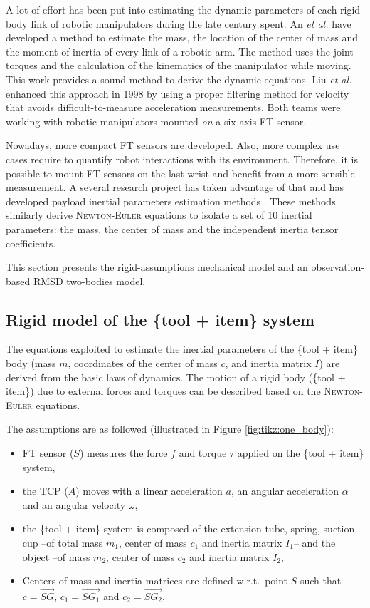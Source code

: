 \documentclass[/home/francois/latex/report/main.tex]{subfiles}
\begin{document}
A lot of effort has been put into estimating the dynamic parameters of each rigid body link of robotic manipulators during the late century spent. An \textit{et al.} \cite{An1985} have developed a method to estimate the mass, the location of the center of mass and the moment of inertia of every link of a robotic arm. The method uses the joint torques and the calculation of the kinematics of the manipulator while moving. This work provides a sound method to derive the dynamic equations. Liu \textit{et al.} enhanced this approach in 1998 \cite{Liu1998} by using a proper filtering method for velocity that avoids difficult-to-measure acceleration measurements. Both teams were working with robotic manipulators mounted \textit{on} a six-axis \ac{FT} sensor.

Nowadays, more compact \ac{FT} sensors are developed. Also, more complex use cases require to quantify robot interactions with its environment. Therefore, it is possible to mount \ac{FT} sensors on the last wrist and benefit from a more sensible measurement. A several research project has taken advantage of that and has developed payload inertial parameters estimation methods \cite{Kubus2008, Kubus2007, Kubus2014, Farsoni2018}. These methods similarly derive \textsc{Newton-Euler} equations to isolate a set of 10 inertial parameters: the mass, the center of mass and the independent inertia tensor coefficients.

This section presents the rigid-assumptions mechanical model and an observation-based \ac{RMSD} two-bodies model.

\subsection{Rigid model of the \{tool + item\} system}
\label{section:background:rigid}

The equations exploited to estimate the inertial parameters of the \{tool + item\} body (mass $m$, coordinates of the center of mass $c$, and inertia matrix $I$) are derived from the basic laws of dynamics. The motion of a rigid body (\{tool + item\}) due to external forces and torques can be described based on the \textsc{Newton-Euler} equations.

The assumptions are as followed (illustrated in Figure \ref{fig:tikz:one_body}):

\begin{itemize}
 \item \ac{FT} sensor ($S$) measures the force $f$ and torque $\tau$ applied on the \{tool + item\} system,
 \item the \ac{TCP} ($A$) moves with a linear acceleration $a$, an angular acceleration $\alpha$ and an angular velocity $\omega$,
 \item the \{tool + item\} system is composed of the extension tube, spring, suction cup –of total mass $m_1$, center of mass $c_1$ and inertia matrix $I_1$– and the object –of mass $m_2$, center of mass $c_2$ and inertia matrix $I_2$,
 \item Centers of mass and inertia matrices are defined w.r.t.\ point $S$ such that $c = \overrightarrow{SG}$, $c_1 = \overrightarrow{SG_1}$ and $c_2 = \overrightarrow{SG_2}$.
\end{itemize}
\end{document}
